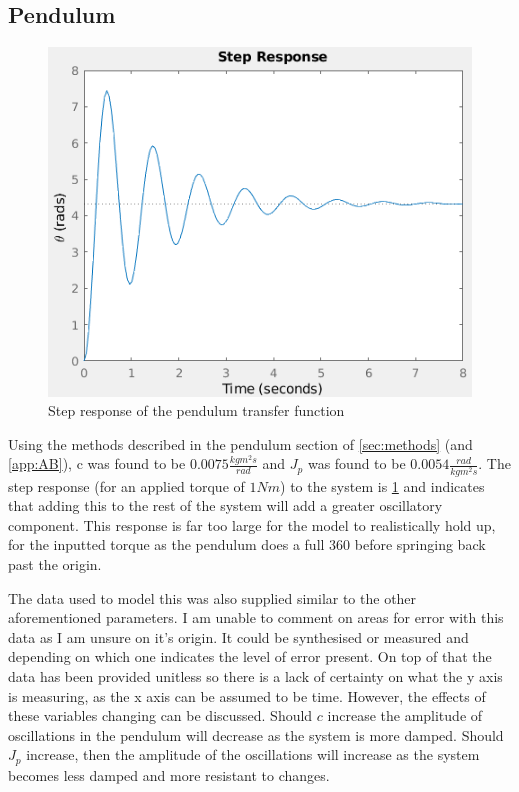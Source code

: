 \documentclass[a4paper, 11pt, compsoc]{IEEEtran}
\begin{document}
        \subsection{Pendulum}
            \begin{figure}[]
                \centering
                \includegraphics[width=\columnwidth]{pendulumStepResponse.png}
                \caption{Step response of the pendulum transfer function}
                \label{fig:pendulumResponse}
            \end{figure}
            Using the methods described in the pendulum section of \cref{sec:methods} (and \cref{app:AB}), c was found to be $0.0075 \frac{kg m^2 s}{rad}$ and $J_p$ was found to be $0.0054 \frac{rad}{kg m^2 s}$. The step response (for an applied torque of $1Nm$) to the system is \cref{fig:pendulumResponse} and indicates that adding this to the rest of the system will add a greater oscillatory component. This response is far too large for the model to realistically hold up, for the inputted torque as the pendulum does a full 360 before springing back past the origin. 
            \par
            The data used to model this was also supplied similar to the other aforementioned parameters. I am unable to comment on areas for error with this data as I am unsure on it's origin. It could be synthesised or measured and depending on which one indicates the level of error present. On top of that the data has been provided unitless so there is a lack of certainty on what the y axis is measuring, as the x axis can be assumed to be time. However, the effects of these variables changing can be discussed. Should $c$ increase the amplitude of oscillations in the pendulum will decrease as the system is more damped. Should $J_p$ increase, then the amplitude of the oscillations will increase as the system becomes less damped and more resistant to changes. 
\end{document}
